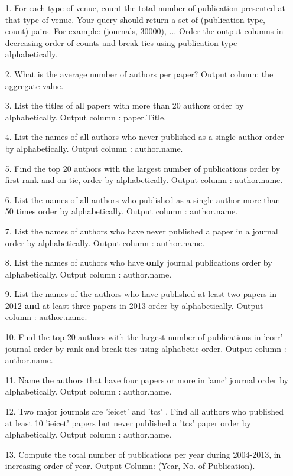 \documentclass[10pt]{article}
\begin{document}
\begin{enumerate}
\item
[1.] For each type of venue, count the total number of publication presented at that type of venue. Your query should return a set of (publication-type, count) pairs. For example: (journals, 30000), ... Order the output columns in decreasing order of counts and break ties using publication-type alphabetically.
\item
[2.] What is the average number of authors per paper? Output column: the aggregate value.
\item
[3.] List the titles of all papers with more than 20 authors order by alphabetically. Output column : paper.Title.
\item
[4.] List the names of all authors who never published as a single author order by alphabetically. Output column : author.name.
\item
[5.] Find the top 20 authors with the largest number of publications order by first rank and on tie, order by alphabetically. Output column : author.name.
\item
[6.] List the names of all authors who published as a single author more than 50 times order by alphabetically. Output column : author.name.
\item
[7.] List the names of authors who have never published a paper in a journal order by alphabetically. Output column : author.name.
\item
[8.] List the names of authors who have \textbf{only} journal publications order by alphabetically. Output column : author.name.
\item
[9.] List the names of the authors who have published at least two papers in 2012 \textbf{and} at least three papers in 2013 order by alphabetically. Output column : author.name.
\item
[10.] Find the top 20 authors with the largest number of publications in 'corr' journal order by rank and break ties using alphabetic order. Output column : author.name.
\item
[11.] Name the authors that have four papers or more in 'amc' journal order by alphabetically. Output column : author.name.
\item
[12.] Two major journals are 'ieicet' and 'tcs' . Find all authors who published at least 10 'ieicet' papers but never published a 'tcs' paper order by alphabetically. Output column : author.name.
\item
[13.] Compute the total number of publications per year during 2004-2013, in increasing order of year. Output Column: (Year, No. of Publication).

\end{enumerate}
\end{document}
